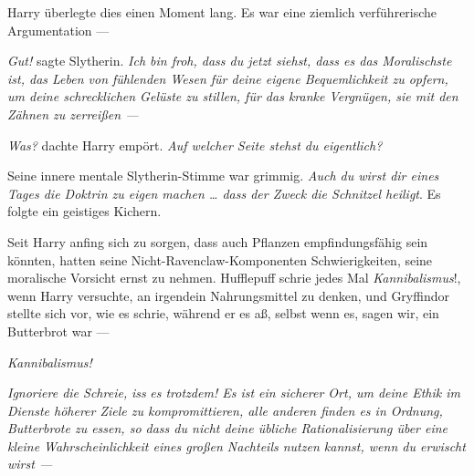 Harry überlegte dies einen Moment lang. Es war eine ziemlich verführerische Argumentation —

\emph{Gut!} sagte Slytherin. \emph{Ich bin froh, dass du jetzt siehst, dass es das Moralischste ist, das Leben von fühlenden Wesen für deine eigene Bequemlichkeit zu opfern, um deine schrecklichen Gelüste zu stillen, für das kranke Vergnügen, sie mit den Zähnen zu zerreißen —}

\emph{Was?} dachte Harry empört. \emph{Auf welcher Seite stehst du eigentlich?}

Seine innere mentale Slytherin-Stimme war grimmig. \emph{Auch du wirst dir eines Tages die Doktrin zu eigen machen … dass der Zweck die Schnitzel heiligt}. Es folgte ein geistiges Kichern.

Seit Harry anfing sich zu sorgen, dass auch Pflanzen empfindungsfähig sein könnten, hatten seine Nicht-Ravenclaw-Komponenten Schwierigkeiten, seine moralische Vorsicht ernst zu nehmen. Hufflepuff schrie jedes Mal \emph{Kannibalismus}!, wenn Harry versuchte, an irgendein Nahrungsmittel zu denken, und Gryffindor stellte sich vor, wie es schrie, während er es aß, selbst wenn es, sagen wir, ein Butterbrot war —

\emph{Kannibalismus!}

\emph{}

\emph{Ignoriere die Schreie,} \emph{iss} \emph{es trotzdem! Es ist ein sicherer Ort, um deine Ethik im Dienste höherer Ziele zu kompromittieren, alle anderen finden es in Ordnung, Butterbrote zu essen, so dass du nicht deine übliche Rationalisierung über eine kleine Wahrscheinlichkeit eines großen Nachteils nutzen kannst, wenn du erwischt wirst —}

